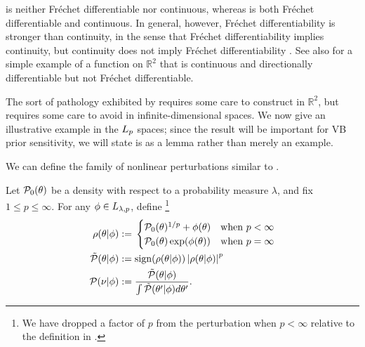  is neither Fr{\'e}chet differentiable nor continuous,
whereas  is both Fr{\'e}chet differentiable and
continuous.  In general, however, Fr{\'e}chet differentiability is stronger than
continuity, in the sense that Fr{\'e}chet differentiability implies continuity,
but continuity does not imply Fr{\'e}chet differentiability \citep[Proposition
4.8 (d)]{zeidler:2013:functional}.  See also \citet[Example
1.9]{averbukh:1967:theory} for a simple example of a function on $\mathbb{R}^2$
that is continuous and directionally differentiable but not Fr{\'e}chet
differentiable.

The sort of pathology exhibited by 
requires some care to construct in $\mathbb{R}^2$, but requires some care to
avoid in infinite-dimensional spaces.  We now give an illustrative example in
the ${L_{p}}$ spaces; since the result will be important for VB prior
sensitivity, we will state is as a lemma rather than merely an example.

We can define the family of nonlinear perturbations similar to
\citep{gustafson:1996:local}.

\begin{defn}
%
Let $\mathcal{P}_{0}(\theta)$ be a density with respect to a probability measure
$\lambda$, and fix $1 \le p \le \infty$.  For any $\phi \in {L_{\lambda,p}}$,
define \footnote{We have dropped a factor of $p$ from the perturbation when $p <
\infty$ relative to the definition in \citep{gustafson:1996:local}.}
%
\begin{align*}
%
\rho(\theta \vert \phi) :={}& \begin{cases}
%
\pbase(\theta)^{1/p} + \phi(\theta)
    & \textrm{when }p < \infty \\
\pbase(\theta)\exp(\phi(\theta))
    & \textrm{when }p = \infty
%
\end{cases}\\
%
\tilde{\p}(\theta \vert \phi) :={}&
    \mathrm{sign}(\rho(\theta \vert \phi)) \abs{\rho(\theta \vert \phi)}^p\\
\p(\nu \vert \phi) :={}&
    \frac{\tilde{\p}(\theta \vert \phi)}{\int \tilde{\p}(\theta' \vert \phi) d\theta'}.
%
\end{align*}
%
\end{defn}
%

